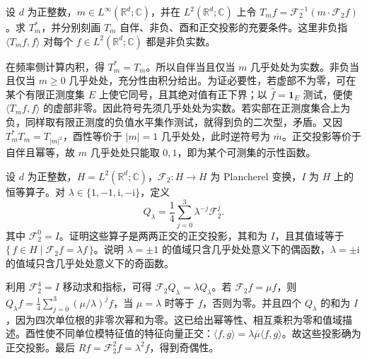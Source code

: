 \begin{exercise}\label{b2:ex:04-multiplier-classification}
设 \(d\) 为正整数，\(m\in L^\infty(\mathbb R^d;\mathbb C)\)，并在 \(L^2(\mathbb R^d;\mathbb C)\) 上令 \(T_mf=\mathcal F_2^{-1}(m\cdot\mathcal F_2f)\)。求 \(T_m^*\)，并分别刻画 \(T_m\) 自伴、非负、酉和正交投影的充要条件。这里非负指 \(\langle T_mf,f\rangle\) 对每个 \(f\in L^2(\mathbb R^d;\mathbb C)\) 都是非负实数。
\end{exercise}
\begin{solution}
在频率侧计算内积，得 \(T_m^*=T_{\overline m}\)。所以自伴当且仅当 \(m\) 几乎处处为实数。非负当且仅当 \(m\geq0\) 几乎处处，充分性由积分给出。为证必要性，若虚部不为零，可在某个有限正测度集 \(E\) 上使它同号，且其绝对值有正下界；以 \(\widehat f=\mathbf1_E\) 测试，便使 \(\langle T_mf,f\rangle\) 的虚部非零。因此符号先须几乎处处为实数。若实部在正测度集合上为负，同样取有限正测度的负值水平集作测试，就得到负的二次型，矛盾。又因 \(T_m^*T_m=T_{|m|^2}\)，酉性等价于 \(|m|=1\) 几乎处处，此时逆符号为 \(\overline m\)。正交投影等价于自伴且幂等，故 \(m\) 几乎处处只能取 \(0,1\)，即为某个可测集的示性函数。
\end{solution}

\begin{optionalexercise}\label{b2:ex:04-four-sectors}
设 \(d\) 为正整数，\(H=L^2(\mathbb R^d;\mathbb C)\)，\(\mathcal F_2\colon H\to H\) 为 Plancherel 变换，\(I\) 为 \(H\) 上的恒等算子。对 \(\lambda\in\{1,-1,\mathrm{i},-\mathrm{i}\}\)，定义
\[
 Q_\lambda=\dfrac14\sum_{j=0}^3\lambda^{-j}\mathcal F_2^j.
\]
其中 \(\mathcal F_2^0=I\)。证明这些算子是两两正交的正交投影，其和为 \(I\)，且其值域等于 \(\{\,f\in H\mid\mathcal F_2f=\lambda f\,\}\)。说明 \(\lambda=\pm1\) 的值域只含几乎处处意义下的偶函数，\(\lambda=\pm\mathrm{i}\) 的值域只含几乎处处意义下的奇函数。
\end{optionalexercise}
\begin{solution}
利用 \(\mathcal F_2^4=I\) 移动求和指标，可得 \(\mathcal F_2Q_\lambda=\lambda Q_\lambda\)。若 \(\mathcal F_2f=\mu f\)，则 \(Q_\lambda f=\frac14\sum_{j=0}^3(\mu/\lambda)^jf\)，当 \(\mu=\lambda\) 时等于 \(f\)，否则为零。并且四个 \(Q_\lambda\) 的和为 \(I\)，因为四次单位根的非零次幂和为零。这已给出幂等性、相互乘积为零和值域描述。酉性使不同单位模特征值的特征向量正交：\(\langle f,g\rangle=\lambda\overline\mu\langle f,g\rangle\)。故这些投影确为正交投影。最后 \(Rf=\mathcal F_2^2f=\lambda^2f\)，得到奇偶性。
\end{solution}

